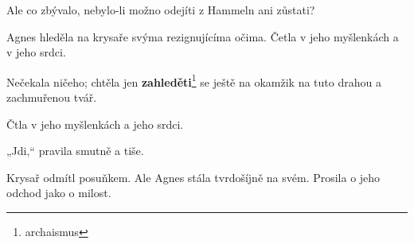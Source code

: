 \documentclass[10pt,a4paper]{article}
\begin{document}
Ale co zbývalo, nebylo-li možno odejíti z Hammeln ani zůstati?

Agnes hleděla na krysaře svýma rezignujícíma očima. Četla v jeho myšlenkách a v jeho srdci.

Nečekala ničeho; chtěla jen \textbf{zahleděti}\footnote{archaismus} se ještě na okamžik na tuto drahou a zachmuřenou tvář.

Čtla v jeho myšlenkách a jeho srdci.

„Jdi,“ pravila smutně a tiše.

Krysař odmítl posuňkem. Ale Agnes stála tvrdošíjně na svém. Prosila o jeho odchod jako o milost.
\end{document}
